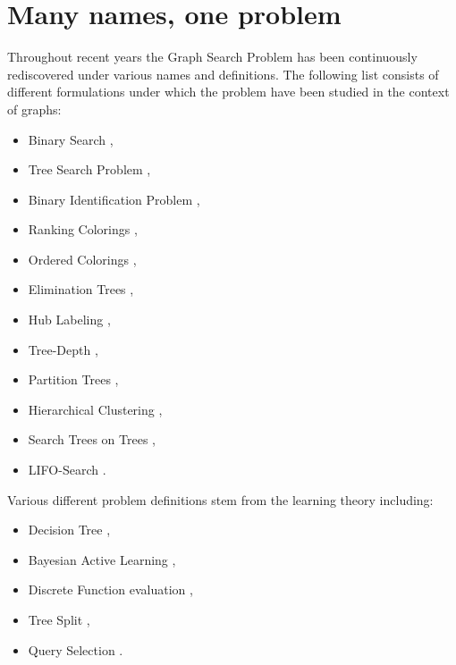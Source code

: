 \section{Many names, one problem}

Throughout recent years the Graph Search Problem has been continuously rediscovered under various names and definitions. 
The following list consists of different formulations under which the problem have been studied in the context of graphs: 
\begin{itemize}
    \item Binary Search \cite{Knuth1973, OnakParys2006GenOfBSSInTsAndFLikePosets, dereniowski2017ApproxSsForGeneralBSinWTs, Deligkas2019BsInGsRev, Emamjomeh2016DetAndProbBSinGs, dereniowski2022CFApproxAlgForBSInTsWithMonoQTimes, dereniowski2024SInTsMonoQTs, noisyBSSFC, Dereniowski2024OnMG, EfficientNoisyBinarySearch, Dereniowski2023Edge},
    \item Tree Search Problem \cite{Jacobs2010OnTheComplexSearchInTsAvg, Cicalese2014ImprovedApproxAvgTs, Cicalese2016OnTSPwNonUniCost}, 
    \item Binary Identification Problem \cite{Cicalese2012BinIdentPForWTs, Karbasi2013Constrained}, 
    \item Ranking Colorings \cite{Dereniowski2009ERankOfWTs, DereniowskiERAndSInPOSets, DereniowskiEfPQProcByGRank, DereniowskiVxRankOfChGsAndWTs, Lam1998ERankOfGsIsH}, 
    \item Ordered Colorings \cite{KATCHALSKI1995141}, 
    \item Elimination Trees \cite{Pothen1988OptimalEliminationTrees}, 
    \item Hub Labeling \cite{Angelidakis2018ShortestPQ},
    \item Tree-Depth \cite{NESETRIL20061022, BOROWIECKI2023113682},
    \item Partition Trees \cite{OnDasHC, Hgemo2024TightAB},
    \item Hierarchical Clustering \cite{Approximatehierarchicalclusteringviasparsestcutandspreadingmetrics}, 
    \item Search Trees on Trees \cite{SplayTonT, Fast_app_centroid_trees}, 
    \item LIFO-Search \cite{GIANNOPOULOU20122089}. 
\end{itemize}
Various different problem definitions stem from the learning theory including:
\begin{itemize}
    \item Decision Tree \cite{LABER2004209,ATightAnalysisofGreedy, GuptasApproxAlgsForOptDTsAndAdaptTSPPs, Tradingoff},
    \item Bayesian Active Learning \cite{NearoptimalBayesianactivelearning,Analysisofgreedyactivelearningstrategy,BayesianLearnerOptimalNoisyBinarySearch},
    \item Discrete Function evaluation \cite{Diagnosisdetermination},
    \item Tree Split \cite{OnanOptimalSplitTreeProblem},
    \item Query Selection \cite{QuerySelection}.
\end{itemize}

